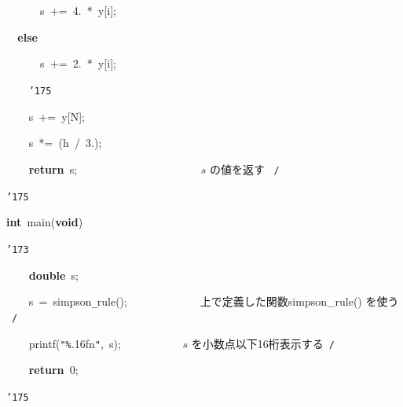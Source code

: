\documentclass[a4paper,10pt]{article}
\def\mc{\relax}
\begin{document}
\noindent
\mbox{}{\tt\mc \ }{\tt\mc \ }{\tt\mc \ }{\tt\mc \ }{\tt\mc \ }{\tt\mc \ }s{\tt\mc \ }+={\tt\mc \ }4.{\tt\mc \ }*{\tt\mc \ }y[i];

\noindent
\mbox{}{\tt\mc \ }{\tt\mc \ }\textbf{else}

\noindent
\mbox{}{\tt\mc \ }{\tt\mc \ }{\tt\mc \ }{\tt\mc \ }{\tt\mc \ }{\tt\mc \ }s{\tt\mc \ }+={\tt\mc \ }2.{\tt\mc \ }*{\tt\mc \ }y[i];

\noindent
\mbox{}{\tt\mc \ }{\tt\mc \ }{\tt\mc \ }{\tt\mc \ }{\tt\char'175}

\noindent
\mbox{}{\tt\mc \ }{\tt\mc \ }{\tt\mc \ }{\tt\mc \ }s{\tt\mc \ }+={\tt\mc \ }y[N];

\noindent
\mbox{}{\tt\mc \ }{\tt\mc \ }{\tt\mc \ }{\tt\mc \ }s{\tt\mc \ }*={\tt\mc \ }(h{\tt\mc \ }/{\tt\mc \ }3.);

\noindent
\mbox{}{\tt\mc \ }{\tt\mc \ }{\tt\mc \ }{\tt\mc \ }\textbf{return}{\tt\mc \ }s;{\tt\mc \ }{\tt\mc \ }{\tt\mc \ }{\tt\mc \ }{\tt\mc \ }{\tt\mc \ }{\tt\mc \ }{\tt\mc \ }{\tt\mc \ }{\tt\mc \ }{\tt\mc \ }{\tt\mc \ }{\tt\mc \ }{\tt\mc \ }{\tt\mc \ }{\tt\mc \ }{\tt\mc \ }{\tt\mc \ }{\tt\mc \ }{\tt\mc \ }{\tt\mc \ }\rm\mc {\tt /}{\tt *}\  $s$ の値を返す \hfill \rm\mc \ {\tt *}{\tt /}
\tt\mc 

\noindent
\mbox{}{\tt\char'175}

\noindent
\mbox{}\hfill

\noindent
\mbox{}\textbf{int}{\tt\mc \ }main(\textbf{void})

\noindent
\mbox{}{\tt\char'173}

\noindent
\mbox{}{\tt\mc \ }{\tt\mc \ }{\tt\mc \ }{\tt\mc \ }\textbf{double}{\tt\mc \ }s;

\noindent
\mbox{}\hfill

\noindent
\mbox{}{\tt\mc \ }{\tt\mc \ }{\tt\mc \ }{\tt\mc \ }s{\tt\mc \ }={\tt\mc \ }simpson{\tt\_}rule();{\tt\mc \ }{\tt\mc \ }{\tt\mc \ }{\tt\mc \ }{\tt\mc \ }{\tt\mc \ }{\tt\mc \ }{\tt\mc \ }{\tt\mc \ }{\tt\mc \ }{\tt\mc \ }\rm\mc {\tt /}{\tt *}\  \ 上で定義した関数simpson\_rule() を使う \hfill \rm\mc \ {\tt *}{\tt /}
\tt\mc 

\noindent
\mbox{}{\tt\mc \ }{\tt\mc \ }{\tt\mc \ }{\tt\mc \ }printf({\tt "}{\tt\%}.16f{\tt{}}n{\tt "},{\tt\mc \ }s);{\tt\mc \ }{\tt\mc \ }{\tt\mc \ }{\tt\mc \ }{\tt\mc \ }{\tt\mc \ }{\tt\mc \ }{\tt\mc \ }{\tt\mc \ }\rm\mc {\tt /}{\tt *}\  \ $s$ を小数点以下16桁表示する\hfill \rm\mc \ {\tt *}{\tt /}
\tt\mc 

\noindent
\mbox{}{\tt\mc \ }{\tt\mc \ }{\tt\mc \ }{\tt\mc \ }\textbf{return}{\tt\mc \ }0;

\noindent
\mbox{}{\tt\char'175}

\rm\mc
\end{document}
